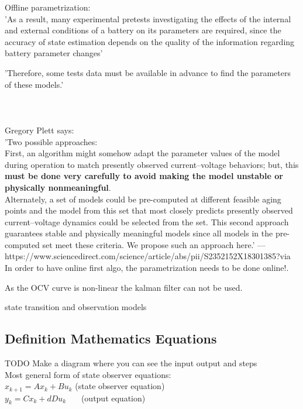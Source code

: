 Offline parametrization: \\
'As a result, many experimental pretests investigating the
effects of the internal and external conditions of a battery on its parameters are required, since the
accuracy of state estimation depends on the quality of the information regarding battery parameter
changes'

'Therefore, some tests data must be available in 
advance to find the parameters of these models.'
\cite{hussein2011overview}  \\ \\ \\ \\

Gregory Plett says: \\
'Two possible approaches: \\

First, an algorithm might somehow adapt the parameter values of the model during operation to match presently observed current–voltage behaviors; but, this \textbf{must be done very carefully to avoid making the model unstable or physically nonmeaningful}. \\

Alternately, a set of models could be pre-computed at different feasible aging points and the model from this set that most closely predicts presently observed current–voltage dynamics could be selected from the set. This second approach guarantees stable and physically meaningful models since all models in the pre-computed set meet these criteria. We propose such an approach here.' 
---https://www.sciencedirect.com/science/article/abs/pii/S2352152X18301385?via%
In order to have online first algo, the parametrization needs to be done online!. 

As the OCV curve is non-linear the kalman filter can not be used. 

state transition and observation models


\subsection{Definition Mathematics Equations }
 
TODO Make a diagram where you can see the input output and steps\\


Most general form of  state observer equations: \\
$ x_{k+1}=Ax_{k}+Bu_{k} $ (state observer equation) \\
$ y_{k}=Cx_{k}+dDu_{k} $ \ \ \  (output equation)\\ 

